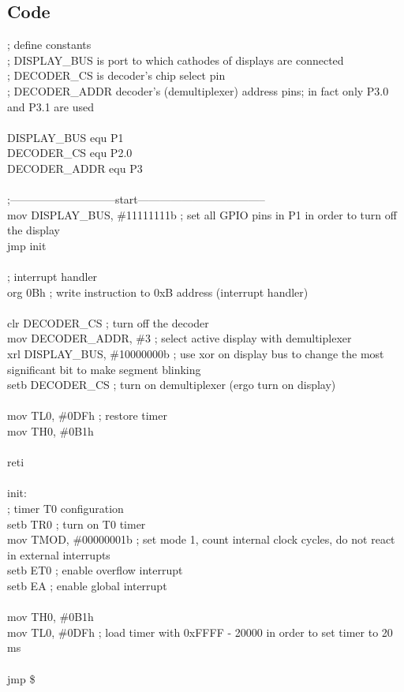 \documentclass{article}
\begin{document}
\subsection{Code}
\ttfamily
; define constants\\
; DISPLAY\_BUS is port to which cathodes of displays are connected\\
; DECODER\_CS is decoder's chip select pin\\
; DECODER\_ADDR decoder's (demultiplexer) address pins; in fact only P3.0 and P3.1 are used\\
\\
DISPLAY\_BUS     equ     P1\\
DECODER\_CS      equ     P2.0\\
DECODER\_ADDR    equ     P3\\
\\
;-----------------------------start-----------------------------------\\
    mov     DISPLAY\_BUS, \#11111111b ; set all GPIO pins in P1 in order to turn off the display\\
    jmp     init\\
\\
    ; interrupt handler\\
    org     0Bh                         ; write instruction to 0xB address (interrupt handler)\\
\\
    clr     DECODER\_CS                  ; turn off the decoder\\
    mov     DECODER\_ADDR, \#3            ; select active display with demultiplexer\\
    xrl     DISPLAY\_BUS, \#10000000b     ; use xor on display bus to change the most significant bit to make segment blinking\\
    setb    DECODER\_CS                  ; turn on demultiplexer (ergo turn on display)\\
\\
    mov     TL0, \#0DFh                   ; restore timer\\
    mov     TH0, \#0B1h\\
\\
    reti\\
    \\
init:\\
; timer T0 configuration\\
    setb    TR0                 ; turn on T0 timer\\
    mov     TMOD, \#00000001b    ; set mode 1, count internal clock cycles, do not react in external interrupts\\
    setb    ET0                 ; enable overflow interrupt\\
    setb    EA                  ; enable global interrupt\\
\\
    mov     TH0, \#0B1h\\
    mov     TL0, \#0DFh           ; load timer with 0xFFFF - 20000 in order to set timer to 20 ms\\
\\
    jmp     \$
\end{document}
